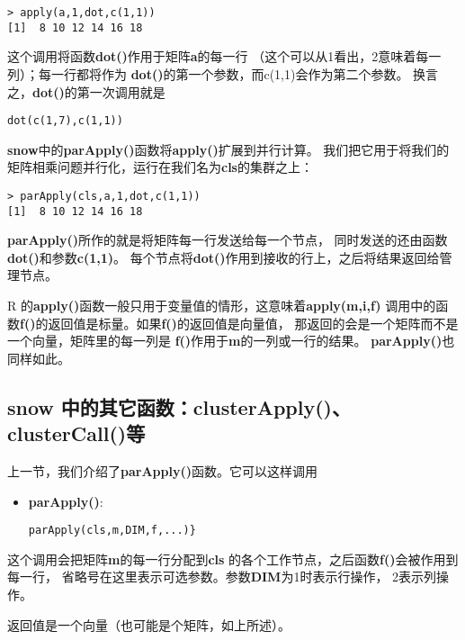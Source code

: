 \begin{lstlisting}
> apply(a,1,dot,c(1,1))
[1]  8 10 12 14 16 18
\end{lstlisting}

这个调用将函数{\bf dot()}作用于矩阵{\bf a}的每一行
（这个可以从1看出，2意味着每一列）；每一行都将作为
{\bf dot()}的第一个参数，而c(1,1)会作为第二个参数。
换言之，{\bf dot()}的第一次调用就是

\begin{lstlisting}
dot(c(1,7),c(1,1))
\end{lstlisting}

{\bf snow}中的{\bf parApply()}函数将{\bf apply()}扩展到并行计算。
我们把它用于将我们的矩阵相乘问题并行化，运行在我们名为{\bf cls}的集群之上：

\begin{lstlisting}
> parApply(cls,a,1,dot,c(1,1))
[1]  8 10 12 14 16 18
\end{lstlisting}

{\bf parApply()}所作的就是将矩阵每一行发送给每一个节点，
同时发送的还由函数{\bf dot()}和参数{\bf c(1,1)}。
每个节点将{\bf dot()}作用到接收的行上，之后将结果返回给管理节点。

R 的{\bf apply()}函数一般只用于变量值的情形，这意味着{\bf apply(m,i,f)}
调用中的函数{\bf f()}的返回值是标量。如果{\bf f()}的返回值是向量值，
那返回的会是一个矩阵而不是一个向量，矩阵里的每一列是
{\bf f()}作用于{\bf m}的一列或一行的结果。
{\bf parApply()}也同样如此。

\subsection{snow 中的其它函数：clusterApply()、clusterCall()等}

上一节，我们介绍了{\bf parApply()}函数。它可以这样调用

\begin{itemize}

\item {{\bf parApply()}:}

\begin{lstlisting}
parApply(cls,m,DIM,f,...)}
\end{lstlisting}

\end{itemize}

这个调用会把矩阵{\bf m}的每一行分配到{\bf cls}
的各个工作节点，之后函数{\bf f()}会被作用到每一行，
省略号在这里表示可选参数。参数{\bf DIM}为1时表示行操作，
2表示列操作。

返回值是一个向量（也可能是个矩阵，如上所述）。

